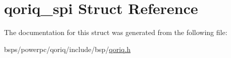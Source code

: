 \hypertarget{structqoriq__spi}{}\section{qoriq\+\_\+spi Struct Reference}
\label{structqoriq__spi}


The documentation for this struct was generated from the following file\+:\begin{DoxyCompactItemize}
\item 
bsps/powerpc/qoriq/include/bsp/\mbox{\hyperlink{qoriq_8h}{qoriq.\+h}}\end{DoxyCompactItemize}
